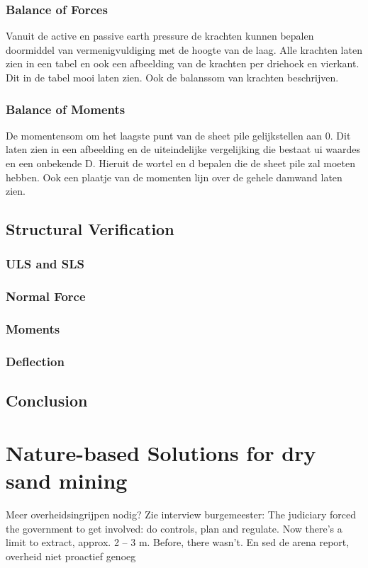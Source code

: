 \subsubsection{Balance of Forces}

Vanuit de active en passive earth pressure de krachten kunnen bepalen doormiddel van vermenigvuldiging met de hoogte van de laag. Alle krachten laten zien in een tabel en ook een afbeelding van de krachten per driehoek en vierkant. Dit in de tabel mooi laten zien. Ook de balanssom van krachten beschrijven.

\subsubsection{Balance of Moments}

De momentensom om het laagste punt van de sheet pile gelijkstellen aan 0. Dit laten zien in een afbeelding en de uiteindelijke vergelijking die bestaat ui waardes en een onbekende D. Hieruit de wortel en d bepalen die de sheet pile zal moeten hebben. Ook een plaatje van de momenten lijn over de gehele damwand laten zien.

\subsection{Structural Verification}

\subsubsection{ULS and SLS}

\subsubsection{Normal Force}

\subsubsection{Moments}

\subsubsection{Deflection}

\subsection{Conclusion}

\section{Nature-based Solutions for dry sand mining}
Meer overheidsingrijpen nodig? Zie interview burgemeester: The judiciary forced the government to get involved: do controls, plan and regulate. Now there’s
a limit to extract, approx. 2 – 3 m. Before, there wasn’t.
En sed de arena report, overheid niet proactief genoeg

